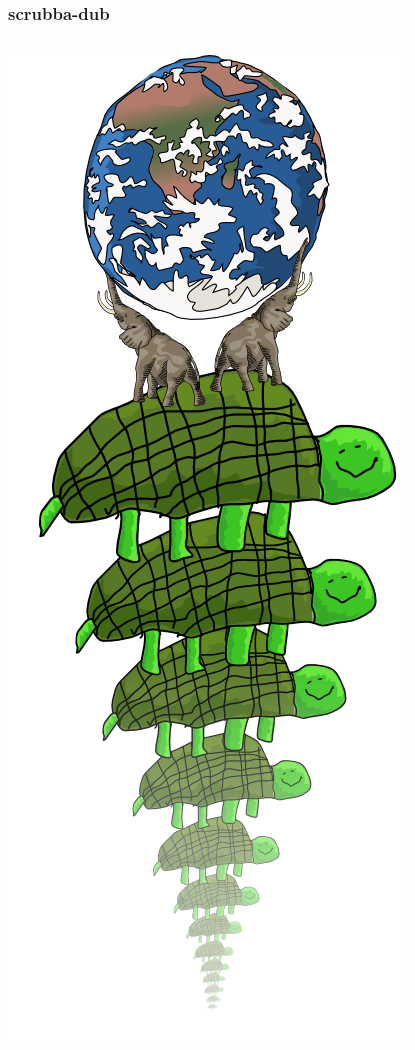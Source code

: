 \documentclass{beamer}
\begin{document}
\begin{frame}
    \frametitle{scrubba-dub}
    \begin{columns}[c]
        \includegraphics[scale=0.28]{images/all_the_way_down.png}
        \begin{center}

\end{center}
\end{columns}
\end{frame}
\end{document}
